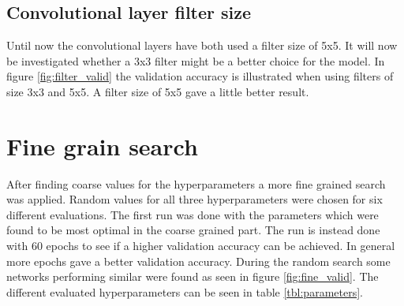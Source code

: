 
\FloatBarrier
\subsection{Convolutional layer filter size}
Until now the convolutional layers have both used a filter size of 5x5. It will now be investigated whether a 3x3 filter might be a better choice for the model. In figure \ref{fig:filter_valid} the validation accuracy is illustrated when using filters of size 3x3 and 5x5. A filter size of 5x5 gave a little better result.



\section{Fine grain search}
After finding coarse values for the hyperparameters a more fine grained search was applied. Random values for all three hyperparameters were chosen for six different evaluations. The first run was done with the parameters which were found to be most optimal in the coarse grained part. The run is instead done with 60 epochs to see if a higher validation accuracy can be achieved. In general more epochs gave a better validation accuracy. During the random search some networks performing similar were found as seen in figure \ref{fig:fine_valid}. The different evaluated hyperparameters can be seen in table \ref{tbl:parameters}.



